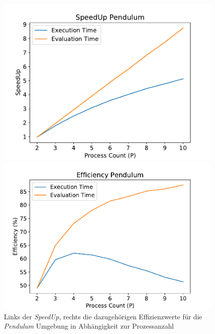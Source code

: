 \begin{figure}[!htb]
	\centering
	\begin{minipage}[]{0.49\textwidth}
		\includegraphics[width=1.0\textwidth]{./img/pendulum_analysis/pendulum_speedup1_2_10.pdf} 
	\end{minipage}
	\hfill
	\begin{minipage}[]{0.49\textwidth}
		\includegraphics[width=1.0\textwidth]{./img/pendulum_analysis/efficiency_pendulum_2_10.pdf} 
	\end{minipage}
	\caption{Links der \emph{SpeedUp}, rechts die dazugehörigen Effizienzwerte für die \emph{Pendulum} Umgebung in Abhängigkeit zur Prozessanzahl}
	\label{fig:pendulum_2_10_efficiency_speedup}
\end{figure}
\\\\
